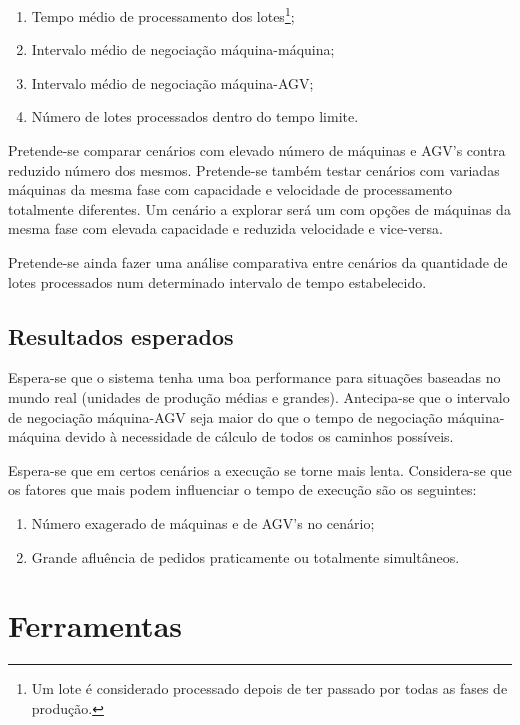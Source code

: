 \begin{titlepage}
\begin{enumerate}
\item Tempo médio de processamento dos lotes\footnote{Um lote é considerado processado depois de ter passado por todas as fases de produção.};
\item Intervalo médio de negociação máquina-máquina;
\item Intervalo médio de negociação máquina-AGV;
\item Número de lotes processados dentro do tempo limite.
\end{enumerate}

Pretende-se comparar cenários com elevado número de máquinas e AGV's contra reduzido número dos mesmos. Pretende-se também testar cenários com variadas máquinas da mesma fase com capacidade e velocidade de processamento totalmente diferentes. Um cenário a explorar será um com opções de máquinas da mesma fase com elevada capacidade e reduzida velocidade e vice-versa.

Pretende-se ainda fazer uma análise comparativa entre cenários da quantidade de lotes processados num determinado intervalo de tempo estabelecido.

\subsection{Resultados esperados}
\justify\normalsize
Espera-se que o sistema tenha uma boa performance para situações baseadas no mundo real (unidades de produção médias e grandes). Antecipa-se que o intervalo de negociação máquina-AGV seja maior do que o tempo de negociação máquina-máquina devido à necessidade de cálculo de todos os caminhos possíveis.

Espera-se que em certos cenários a execução se torne mais lenta. Considera-se que os fatores que mais podem influenciar o tempo de execução são os seguintes:

\begin{enumerate}
\item Número exagerado de máquinas e de AGV's no cenário;
\item Grande afluência de pedidos praticamente ou totalmente simultâneos.
\end{enumerate}



\section{Ferramentas}


\end{titlepage}
